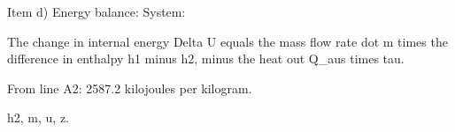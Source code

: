 Item d) Energy balance: System:

The change in internal energy Delta U equals the mass flow rate dot m times the difference in enthalpy h1 minus h2, minus the heat out Q_aus times tau.

From line A2: 2587.2 kilojoules per kilogram.

h2, m, u, z.